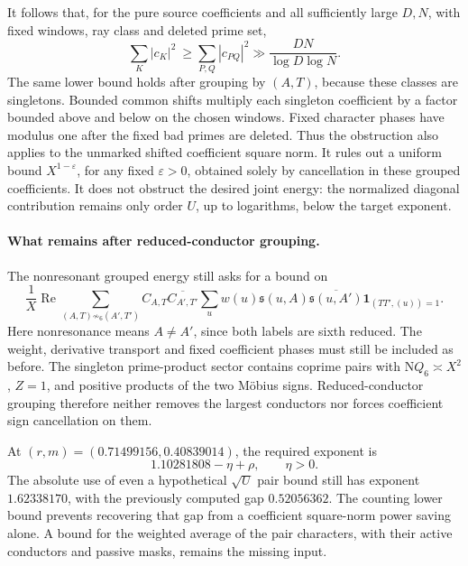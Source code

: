 \documentclass[11pt]{article}
\newcommand{\Nm}{\mathrm N}
\begin{document}
It follows that, for the pure source coefficients and all sufficiently
large \(D,N\), with fixed windows, ray class and deleted prime set,
\[
 \sum_K|c_K|^2\ \ge\sum_{P,Q}|c_{PQ}|^2
       \gg \frac{DN}{\log D\log N}.
\]
The same lower bound holds after grouping by \((A,T)\), because
these classes are singletons. Bounded common shifts multiply each
singleton coefficient by a factor bounded above and below on the
chosen windows. Fixed character phases have modulus one after the
fixed bad primes are deleted. Thus the obstruction also applies to
the unmarked shifted coefficient square norm.
It rules out a uniform bound \(X^{1-\varepsilon}\), for any fixed
\(\varepsilon>0\), obtained solely by cancellation in these grouped
coefficients. It does not obstruct the desired joint energy: the
normalized diagonal contribution remains only order \(U\), up to
logarithms, below the target exponent.

\paragraph{What remains after reduced-conductor grouping.}
The nonresonant grouped energy still asks for a bound on
\[
 \frac1X\operatorname{Re}\sum_{(A,T)\not\sim_6(A',T')}
 C_{A,T}\overline{C_{A',T'}}
 \sum_u w(u)\mathfrak s(u,A)\overline{\mathfrak s(u,A')}
                 \mathbf1_{(TT',(u))=1}.
\]
Here nonresonance means \(A\ne A'\), since both labels are sixth
reduced. The weight, derivative transport and fixed coefficient
phases must still be included as before. The singleton prime-product
sector contains coprime pairs with \(\Nm Q_6\asymp X^2\), \(Z=1\),
and positive products of the two M\"obius signs. Reduced-conductor
grouping therefore neither removes the largest conductors nor
forces coefficient sign cancellation on them.

At \((r,m)=(0.71499156,0.40839014)\), the required exponent is
\[
 1.10281808-\eta+\rho,\qquad \eta>0.
\]
The absolute use of even a hypothetical \(\sqrt U\) pair bound
still has exponent \(1.62338170\), with the previously computed
gap \(0.52056362\). The counting lower bound prevents recovering
that gap from a coefficient square-norm power saving alone.
A bound for the weighted average of the pair characters, with their
active conductors and passive masks, remains the missing input.
\end{document}
